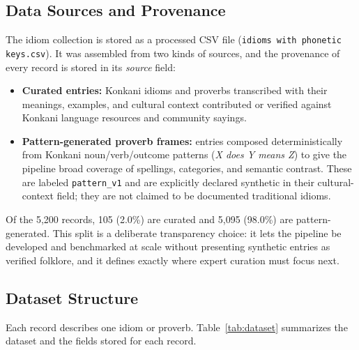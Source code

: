 \documentclass[12pt,a4paper]{article}
\begin{document}
\subsection{Data Sources and Provenance}
The idiom collection is stored as a processed CSV file (\texttt{idioms with phonetic keys.csv}). It was assembled from two kinds of sources, and the provenance of every record is stored in its \emph{source} field:
\begin{itemize}
  \item \textbf{Curated entries:} Konkani idioms and proverbs transcribed with their meanings, examples, and cultural context contributed or verified against Konkani language resources and community sayings.
  \item \textbf{Pattern-generated proverb frames:} entries composed deterministically from Konkani noun/verb/outcome patterns (\emph{X does Y means Z}) to give the pipeline broad coverage of spellings, categories, and semantic contrast. These are labeled \texttt{pattern\_v1} and are explicitly declared synthetic in their cultural-context field; they are not claimed to be documented traditional idioms.
\end{itemize}
Of the 5{,}200 records, 105 (2.0\%) are curated and 5{,}095 (98.0\%) are pattern-generated. This split is a deliberate transparency choice: it lets the pipeline be developed and benchmarked at scale without presenting synthetic entries as verified folklore, and it defines exactly where expert curation must focus next.

\subsection{Dataset Structure}
Each record describes one idiom or proverb. Table~\ref{tab:dataset} summarizes the dataset and the fields stored for each record.
\end{document}

